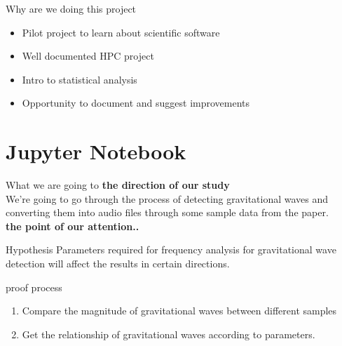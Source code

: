 \documentclass[11pt]{beamer}
\begin{document}
\begin{frame}{Why are we doing this project}
\begin{itemize}
\setlength\itemsep{1em}
\item Pilot project to learn about scientific software
\item Well documented HPC project
\item Intro to statistical analysis
\item Opportunity to document and suggest improvements 
\end{itemize}
\end{frame}

\section{Jupyter Notebook}





\begin{frame}{What we are going to}
\textbf{the direction of our study}\\
We're going to go through the process of detecting gravitational waves and converting them into audio files through some sample data from the paper.\\
\textbf{the point of our attention..}
\\
\begin{block}{Hypothesis}
Parameters required for frequency analysis for gravitational wave detection will affect the results in certain directions.
\end{block}
\begin{block}{proof process}
\begin{itemsize}
\begin{enumerate}
    \item Compare the magnitude of gravitational waves between different samples
    \item Get the relationship of gravitational waves according to parameters. 
\end{enumerate}

\end{itemsize}
\end{block}
\end{frame}
\end{document}
